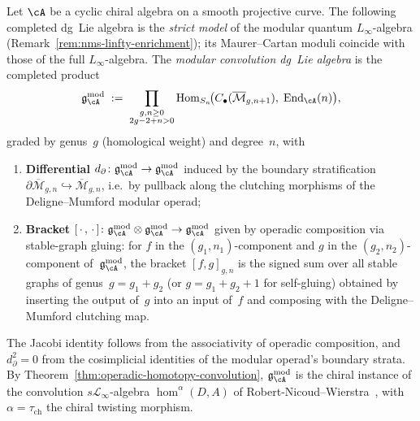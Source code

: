 \begin{definition}
\label{def:nms-modular-convolution-lie}%
%
%
Let $\cA$ be a cyclic chiral algebra on a smooth projective curve.
The following completed dg~Lie algebra is the \emph{strict model}
of the modular quantum $L_\infty$-algebra
(Remark~\ref{rem:nms-linfty-enrichment}); its Maurer--Cartan moduli
coincide with those of the full $L_\infty$-algebra.
The \emph{modular convolution dg~Lie algebra} is the completed product
\[
 \gAmod
 \;:=\;
 \prod_{\substack{g,n \geq 0 \\ 2g-2+n>0}}
	 \operatorname{Hom}_{S_n}\!\bigl(
	 C_\bullet(\overline{\mathcal{M}}_{g,n+1}),\;
	 \operatorname{End}_{\cA}(n)
	 \bigr),
\]
graded by genus~$g$ (homological weight) and degree~$n$, with
\begin{enumerate}[label=\textup{(\roman*)}]
\item \textbf{Differential}
 $d_{\partial}\colon \gAmod \to \gAmod$
 induced by the boundary stratification
 $\partial\overline{\mathcal{M}}_{g,n} \hookrightarrow
 \overline{\mathcal{M}}_{g,n}$, i.e.\ by pullback along the
 clutching morphisms of the Deligne--Mumford modular operad;
\item \textbf{Bracket}
 $[\,\cdot\,,\,\cdot\,]\colon
 \gAmod \otimes \gAmod \to \gAmod$
 given by operadic composition via stable-graph gluing:
 for $f$ in the $(g_1,n_1)$-component and
 $g$ in the $(g_2,n_2)$-component of~$\gAmod$, the bracket
 $[f,g]_{g,n}$ is the signed sum over all stable graphs of
 genus~$g = g_1 + g_2$ (or $g = g_1 + g_2 + 1$ for
 self-gluing) obtained by inserting the output of~$g$
 into an input of~$f$ and composing with the
 Deligne--Mumford clutching map.
\end{enumerate}
The Jacobi identity follows from the associativity of operadic composition, and $d_\partial^2=0$ from the cosimplicial identities of the modular operad's boundary strata.
By Theorem~\ref{thm:operadic-homotopy-convolution}, $\gAmod$ is the
chiral instance of the convolution $s\mathscr{L}_\infty$-algebra
$\operatorname{hom}^\alpha(D,A)$ of Robert-Nicoud--Wierstra~\cite{RNW19},
with $\alpha = \tau_{\mathrm{ch}}$ the chiral twisting morphism.
\end{definition}

